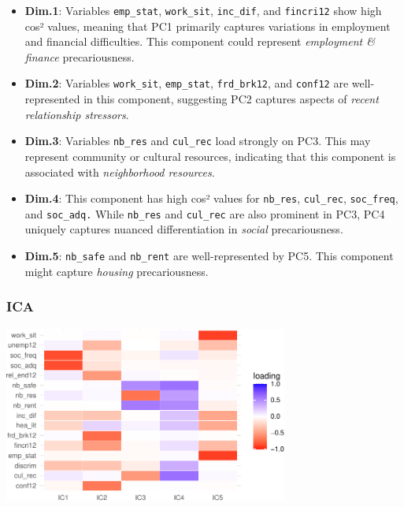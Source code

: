 \documentclass[
]{article}
\begin{document}
\begin{itemize}
\item
  \textbf{Dim.1}: Variables \texttt{emp\_stat}, \texttt{work\_sit},
  \texttt{inc\_dif}, and \texttt{fincri12} show high cos² values,
  meaning that PC1 primarily captures variations in employment and
  financial difficulties. This component could represent
  \emph{employment \& finance} precariousness.
\item
  \textbf{Dim.2}: Variables \texttt{work\_sit}, \texttt{emp\_stat},
  \texttt{frd\_brk12}, and \texttt{conf12} are well-represented in this
  component, suggesting PC2 captures aspects of \emph{recent
  relationship stressors}.
\item
  \textbf{Dim.3}: Variables \texttt{nb\_res} and \texttt{cul\_rec} load
  strongly on PC3. This may represent community or cultural resources,
  indicating that this component is associated with \emph{neighborhood
  resources}.
\item
  \textbf{Dim.4}: This component has high cos² values for
  \texttt{nb\_res}, \texttt{cul\_rec}, \texttt{soc\_freq}, and
  \texttt{soc\_adq.} While \texttt{nb\_res} and \texttt{cul\_rec} are
  also prominent in PC3, PC4 uniquely captures nuanced differentiation
  in \emph{social} precariousness.
\item
  \textbf{Dim.5}: \texttt{nb\_safe} and \texttt{nb\_rent} are
  well-represented by PC5. This component might capture \emph{housing}
  precariousness.
\end{itemize}

\subsubsection{ICA}\label{ica}

\begin{center}
\includegraphics[width=0.7\textwidth,height=\textheight]{draft_v2_files/figure-pdf/unnamed-chunk-18-1.pdf}
\end{center}
\end{document}
